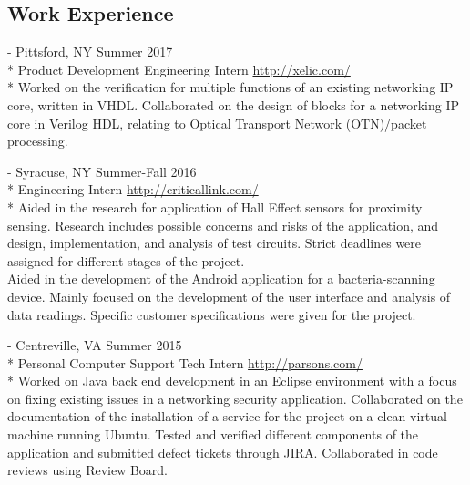 \documentclass[a4paper,margin,line]{resume}
\newcommand{\rurl}[1]{\hfill {\footnotesize \url{#1}}}
\newcommand{\rdate}[1]{\hfill {\small #1}}
\renewcommand{\employer}[5]{ \item[#1] - #2 \rdate{#3} \\* #4 \rurl{#5} \\*}
\begin{document}
\begin{resume}
\section{\mysidestyle Work Experience}
    \begin{asparadesc}
        \employer{Xelic, Inc.}{Pittsford, NY}{Summer 2017}{Product Development Engineering Intern}
        {http://xelic.com/}
        \small Worked on the verification for multiple functions of an existing networking IP core, written in VHDL.  Collaborated on the design of blocks for a networking IP core in Verilog HDL, relating to Optical Transport Network (OTN)/packet processing.
        \\
        \employer{Critical Link LLC}{Syracuse, NY}{Summer-Fall 2016}{Engineering Intern}
        {http://criticallink.com/}
        \small
        Aided in the research for application of Hall Effect sensors for proximity sensing.  
        Research includes possible concerns and risks of the application, and design, implementation, and analysis of 
        test circuits.  Strict deadlines were assigned for different stages of the project.\smallskip\\
        Aided in the development of the Android application for a bacteria-scanning device.  Mainly focused on the development of the user 
        interface and analysis of data readings.  Specific customer specifications were given for the project. 
        \\
        \employer{Parsons Government Services}{Centreville, VA}{Summer 2015}{Personal Computer Support Tech Intern}
        {http://parsons.com/}
        \small
        Worked on Java back end development in an Eclipse environment with a focus on fixing existing 
        issues in a networking security application. Collaborated on the documentation of the installation 
        of a service for the project on a clean virtual machine running Ubuntu. Tested and verified 
        different components of the application and submitted defect tickets through JIRA.  Collaborated 
        in code reviews using Review Board.
        \normalsize
        
    \end{asparadesc}


\end{resume}
\end{document}
